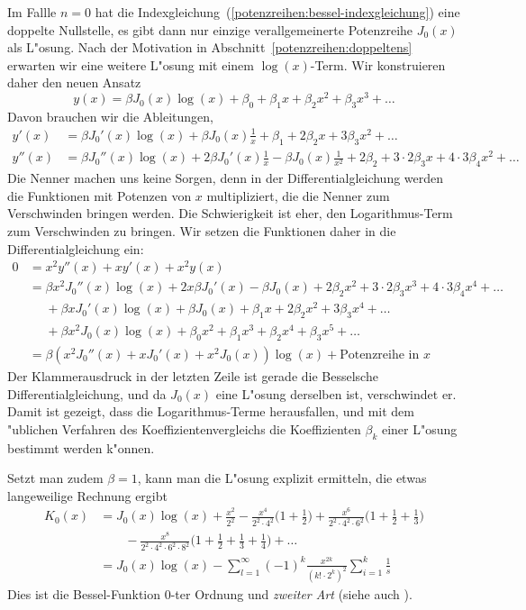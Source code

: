 Im Fallle $n=0$ hat die
Indexgleichung~(\ref{potenzreihen:bessel-indexgleichung}) eine doppelte
Nullstelle, es gibt dann nur einzige verallgemeinerte Potenzreihe
$J_0(x)$ als L"osung.
Nach der Motivation in Abschnitt~\ref{potenzreihen:doppeltens} erwarten
wir eine weitere L"osung mit einem $\log(x)$-Term.
Wir konstruieren daher den neuen Ansatz
\begin{equation}
y(x)
=
\beta J_0(x)\log(x)+\beta_0+\beta_1x+\beta_2x^2+\beta_3x^3+\dots
\label{potenzreihen:k0ansatz}
\end{equation}
Davon brauchen wir die Ableitungen, 
\begin{align*}
y'(x)
&=
\beta J_0'(x)\log(x) + \beta J_0(x)\frac1x+\beta_1+2\beta_2x+3\beta_3x^2+\dots
\\
y''(x)
&=
\beta J_0''(x)\log(x) + 2\beta J_0'(x)\frac1x-\beta J_0(x)\frac1{x^2} + 2\beta_2 + 3\cdot 2\beta_3 x + 4\cdot 3\beta_4 x^2+\dots
\end{align*}
Die Nenner machen uns keine Sorgen, denn in der Differentialgleichung werden
die Funktionen mit Potenzen von $x$ multipliziert, die die Nenner zum
Verschwinden bringen werden.
Die Schwierigkeit ist eher, den Logarithmus-Term zum Verschwinden zu bringen.
Wir setzen die Funktionen daher in die Differentialgleichung ein:
\begin{align*}
0
&=
x^2y''(x)+xy'(x)+x^2y(x)
\\
&=
\beta x^2J_0''(x)\log(x) + 2x\beta J_0'(x)-\beta J_0(x) + 2\beta_2x^2 + 3\cdot 2\beta_3 x^3 + 4\cdot 3\beta_4 x^4+\dots
\\
&\phantom{=}+
\beta xJ_0'(x)\log(x) + \beta J_0(x)+\beta_1x+2\beta_2x^2+3\beta_3x^4+\dots
\\
&\phantom{=}+
\beta x^2J_0(x)\log(x)+\beta_0x^2+\beta_1x^3 +\beta_2x^4+\beta_3x^5+\dots
\\
&=
\beta(x^2J_0''(x)+xJ_0'(x)+x^2J_0(x))\log(x)
+
\text{Potenzreihe in $x$}
\end{align*}
Der Klammerausdruck in der letzten Zeile ist gerade die Besselsche
Differentialgleichung, und da $J_0(x)$ eine L"osung derselben ist,
verschwindet er.
Damit ist gezeigt, dass die Logarithmus-Terme herausfallen, und mit dem
"ublichen Verfahren des Koeffizientenvergleichs die Koeffizienten
$\beta_k$ einer L"osung bestimmt werden k"onnen.

Setzt man zudem $\beta=1$, kann man die L"osung explizit ermitteln, die
etwas langeweilige Rechnung ergibt
\begin{align*}
K_0(x)
&=
J_0(x)\log(x)
+
\frac{x^2}{2^2}
-
\frac{x^4}{2^2\cdot 4^2}\biggl(1+\frac12\biggr)
+
\frac{x^6}{2^2\cdot 4^2\cdot 6^2}\biggl(1+\frac12+\frac13\biggr)
\\
&\qquad
-
\frac{x^8}{2^2\cdot 4^2\cdot 6^2\cdot 8^2}\biggl(1+\frac12+\frac13+\frac14\biggr)
+
\dots
\label{potenzreihen:k0}
\\
&=
J_0(x)\log(x)
-\sum_{l=1}^\infty (-1)^k\frac{x^{2k}}{(k!\cdot 2^k)^2}\sum_{i=1}^k\frac1s
\end{align*}
Dies ist die Bessel-Funktion 0-ter Ordnung und {\em zweiter Art} (siehe auch
\cite{skript:smirnow2}).

